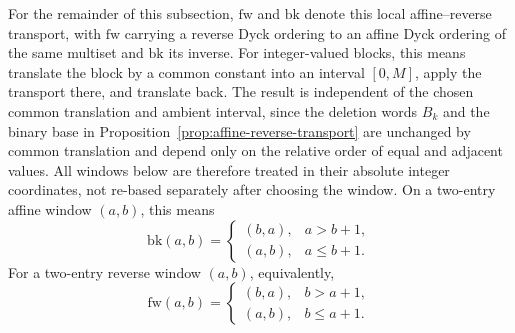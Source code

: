 \documentclass[11pt]{article}
\theoremstyle{plain}
\theoremstyle{definition}
\theoremstyle{remark}
\begin{document}
For the remainder of this subsection, \(\mathrm{fw}\) and \(\mathrm{bk}\)
denote this local affine--reverse transport, with \(\mathrm{fw}\) carrying a
reverse Dyck ordering to an affine Dyck ordering of the same multiset and
\(\mathrm{bk}\) its inverse.  For integer-valued blocks, this means translate
the block by a common constant into an interval \([0,M]\), apply the transport
there, and translate back.  The result is independent of the chosen common
translation and ambient interval, since the deletion words \(B_k\) and the
binary base in Proposition~\ref{prop:affine-reverse-transport} are unchanged
by common translation and depend only on the relative order of equal and
adjacent values.  All windows below are therefore treated in their absolute
integer coordinates, not re-based
separately after choosing the window.  On a two-entry affine window \((a,b)\),
this means
\[
  \mathrm{bk}(a,b)=
  \begin{cases}
    (b,a), & a>b+1,\\
    (a,b), & a\le b+1.
  \end{cases}
\]
For a two-entry reverse window \((a,b)\), equivalently,
\[
  \mathrm{fw}(a,b)=
  \begin{cases}
    (b,a), & b>a+1,\\
    (a,b), & b\le a+1.
  \end{cases}
\]
\end{document}

